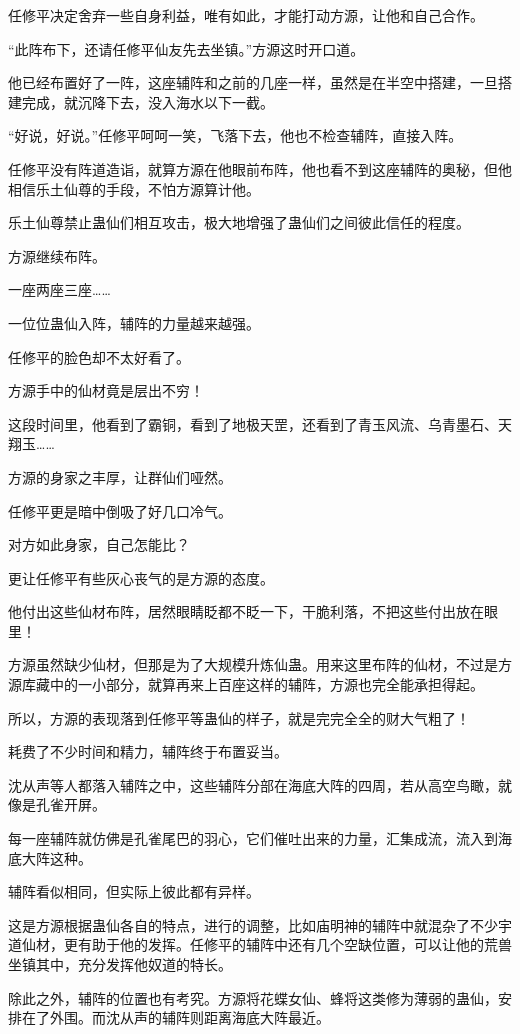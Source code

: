 \begin{this_body}
任修平决定舍弃一些自身利益，唯有如此，才能打动方源，让他和自己合作。

“此阵布下，还请任修平仙友先去坐镇。”方源这时开口道。

他已经布置好了一阵，这座辅阵和之前的几座一样，虽然是在半空中搭建，一旦搭建完成，就沉降下去，没入海水以下一截。

“好说，好说。”任修平呵呵一笑，飞落下去，他也不检查辅阵，直接入阵。

任修平没有阵道造诣，就算方源在他眼前布阵，他也看不到这座辅阵的奥秘，但他相信乐土仙尊的手段，不怕方源算计他。

乐土仙尊禁止蛊仙们相互攻击，极大地增强了蛊仙们之间彼此信任的程度。

方源继续布阵。

一座两座三座……

一位位蛊仙入阵，辅阵的力量越来越强。

任修平的脸色却不太好看了。

方源手中的仙材竟是层出不穷！

这段时间里，他看到了霸铜，看到了地极天罡，还看到了青玉风流、乌青墨石、天翔玉……

方源的身家之丰厚，让群仙们哑然。

任修平更是暗中倒吸了好几口冷气。

对方如此身家，自己怎能比？

更让任修平有些灰心丧气的是方源的态度。

他付出这些仙材布阵，居然眼睛眨都不眨一下，干脆利落，不把这些付出放在眼里！

方源虽然缺少仙材，但那是为了大规模升炼仙蛊。用来这里布阵的仙材，不过是方源库藏中的一小部分，就算再来上百座这样的辅阵，方源也完全能承担得起。

所以，方源的表现落到任修平等蛊仙的样子，就是完完全全的财大气粗了！

耗费了不少时间和精力，辅阵终于布置妥当。

沈从声等人都落入辅阵之中，这些辅阵分部在海底大阵的四周，若从高空鸟瞰，就像是孔雀开屏。

每一座辅阵就仿佛是孔雀尾巴的羽心，它们催吐出来的力量，汇集成流，流入到海底大阵这种。

辅阵看似相同，但实际上彼此都有异样。

这是方源根据蛊仙各自的特点，进行的调整，比如庙明神的辅阵中就混杂了不少宇道仙材，更有助于他的发挥。任修平的辅阵中还有几个空缺位置，可以让他的荒兽坐镇其中，充分发挥他奴道的特长。

除此之外，辅阵的位置也有考究。方源将花蝶女仙、蜂将这类修为薄弱的蛊仙，安排在了外围。而沈从声的辅阵则距离海底大阵最近。


\end{this_body}
